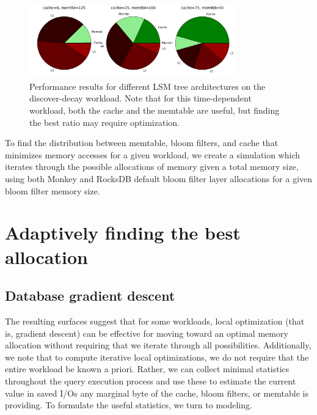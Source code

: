 \documentclass{sig-alternate-05-2015}
\begin{document}
\begin{figure}[!htb]
\begin{center}
\includegraphics[width=9cm]{sameqs-difftree.png}
\end{center}
\caption{Performance results for different LSM tree architectures on the
discover-decay workload. Note that for this time-dependent workload, both the
cache and the memtable are useful, but finding the best ratio may require
optimization.}
\label{fig:sameqs-difftree}
\end{figure}

To find the distribution between memtable, bloom filters, and cache that minimizes memory accesses for a given workload, we create a simulation which iterates through the possible allocations of memory given a total memory size, using both Monkey and RocksDB default bloom filter layer allocations for a given bloom filter memory size. 

\section{Adaptively finding the best allocation}

\subsection{Database gradient descent}



The resulting surfaces suggest that for some workloads, local optimization (that is, gradient descent) can be effective for moving toward an optimal memory allocation without requiring that we iterate through all possibilities. Additionally, we note that to compute iterative local optimizations, we do not require that the entire workload be known a priori. Rather, we can collect minimal statistics throughout the query execution process and use these to estimate the current value in saved I/Os any marginal byte of the cache, bloom filters, or memtable is providing. To formulate the useful statistics, we turn to modeling.

%
\end{document}
